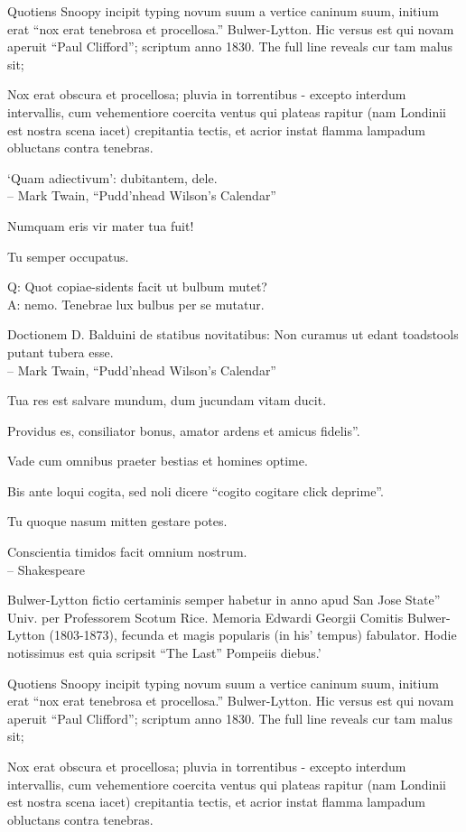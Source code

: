 \documentclass[titlepage,12pt]{memoir}
\begin{document}
Quotiens Snoopy incipit typing novum suum a vertice caninum suum,
initium erat “nox erat tenebrosa et procellosa.”
Bulwer-Lytton. Hic versus est qui novam aperuit “Paul Clifford”;
scriptum anno 1830. The full line reveals cur tam malus sit;

Nox erat obscura et procellosa; pluvia in torrentibus - excepto
interdum intervallis, cum vehementiore coercita
ventus qui plateas rapitur (nam Londinii est nostra scena
iacet) crepitantia tectis, et acrior instat
flamma lampadum obluctans contra tenebras.

‘Quam adiectivum’: dubitantem, dele.
\\-- Mark Twain, “Pudd’nhead Wilson’s Calendar”

Numquam eris vir mater tua fuit!

Tu semper occupatus.

Q: Quot copiae-sidents facit ut bulbum mutet?\\
A: nemo. Tenebrae lux bulbus per se mutatur.

Doctionem D. Balduini de statibus novitatibus: Non curamus ut edant toadstools
putant tubera esse.
\\-- Mark Twain, “Pudd’nhead Wilson’s Calendar”

Tua res est salvare mundum, dum jucundam vitam ducit.

Providus es, consiliator bonus, amator ardens et amicus fidelis”.

Vade cum omnibus praeter bestias et homines optime.

Bis ante loqui cogita, sed noli dicere “cogito cogitare click deprime”.

Tu quoque nasum mitten gestare potes.

Conscientia timidos facit omnium nostrum.
\\-- Shakespeare

Bulwer-Lytton fictio certaminis semper habetur in anno apud San Jose State”
Univ. per Professorem Scotum Rice. Memoria Edwardi Georgii
Comitis Bulwer-Lytton (1803-1873), fecunda et magis popularis (in his’
tempus) fabulator. Hodie notissimus est quia scripsit “The Last”
Pompeiis diebus.’

Quotiens Snoopy incipit typing novum suum a vertice caninum suum,
initium erat “nox erat tenebrosa et procellosa.”
Bulwer-Lytton. Hic versus est qui novam aperuit “Paul Clifford”;
scriptum anno 1830. The full line reveals cur tam malus sit;

Nox erat obscura et procellosa; pluvia in torrentibus - excepto
interdum intervallis, cum vehementiore coercita
ventus qui plateas rapitur (nam Londinii est nostra scena
iacet) crepitantia tectis, et acrior instat
flamma lampadum obluctans contra tenebras.
\end{document}
